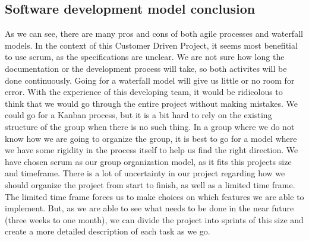 \subsection{Software development model conclusion}
As we can see, there are many pros and cons of both agile processes and waterfall models. In the context of this Customer Driven Project, it seems most benefitial to use scrum, as the specifications are unclear. We are not sure how long the documentation or the development process will take, so both activites will be done continuously. Going for a waterfall model will give us little or no room for error. With the experience of this developing team, it would be ridicolous to think that we would go through the entire project without making mistakes. 
\newline
\newline
We could go for a Kanban process, but it is a bit hard to rely on the existing structure of the group when there is no such thing. In a group where we do not know how we are going to organize the group, it is best to go for a model where we have some rigidity in the process itself to help us find the right direction. 
\newline
\newline
We have chosen scrum as our group organization model, as it fits this projects size and timeframe. There is a lot of uncertainty in our project regarding how we should organize the project from start to finish, as well as a limited time frame. The limited time frame forces us to make choices on which features we are able to implement.  But, as we are able to see what needs to be done in the near future (three weeks to one month), we can divide the project into sprints of this size and create a more detailed description of each task as we go.

